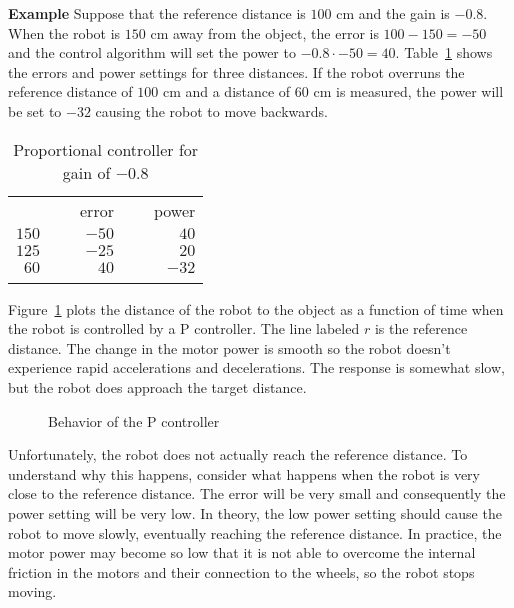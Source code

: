 \medskip

\noindent\textbf{Example} Suppose that the reference distance is $100$ cm and the gain is $-0.8$. When the robot is $150$ cm away from the object, the error is $100-150=-50$ and the control algorithm will set the power to $-0.8\cdot -50=40$. Table~\ref{tab.p-controller} shows the errors and power settings for three distances. If the robot overruns the reference distance of $100$ cm and a distance of $60$ cm is measured, the power will be set to $-32$ causing the robot to move backwards.

\begin{table}
\caption{Proportional controller for gain of $-0.8$}
\label{tab.p-controller}
\begin{tabular}{rrr}
\svhline\noalign{\smallskip}
\multicolumn{1}{c}{distance} & \multicolumn{1}{c}{\ \ \ error}& \multicolumn{1}{c}{\ \ \ power}\\
\noalign{\smallskip}\svhline\noalign{\smallskip}
$150$ & $-50$ & $40$\\
$125$ & $-25$ & $20$\\
$60$ & $40$ & $-32$\\
\noalign{\smallskip}\svhline\noalign{\smallskip}
\end{tabular}
\end{table}

Figure~\ref{fig.p-control} plots the distance of the robot to the object as a function of time when the robot is controlled by a P controller. The line labeled $r$ is the reference distance. The change in the motor power is smooth so the robot doesn't experience rapid accelerations and decelerations. The response is somewhat slow, but the robot does approach the target distance.

\begin{figure}
\begin{center}
\caption{Behavior of the P controller}\label{fig.p-control}
\end{center}
\end{figure}

Unfortunately, the robot does not actually reach the reference distance. To understand why this happens, consider what happens when the robot is very close to the reference distance. The error will be very small and consequently the power setting will be very low. In theory, the low power setting should cause the robot to move slowly, eventually reaching the reference distance. In practice, the motor power may become so low that it is not able to overcome the internal friction in the motors and their connection to the wheels, so the robot stops moving.

